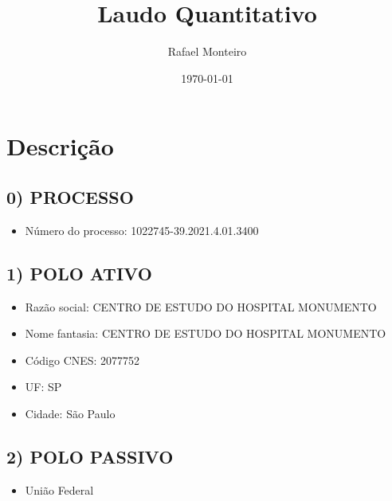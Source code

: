 \documentclass{report}
\title{Laudo Quantitativo}
\author{Rafael Monteiro}
\date{\today}
\begin{document}
\maketitle

\section{Descrição}
\subsection{0) PROCESSO}
\begin{itemize}
	\item{Número do processo: 1022745-39.2021.4.01.3400} 
\end{itemize}


\subsection{1) POLO ATIVO}
\begin{itemize}
	\item{Razão social: CENTRO DE ESTUDO DO HOSPITAL MONUMENTO} 
	\item{Nome fantasia: CENTRO DE ESTUDO DO HOSPITAL MONUMENTO}
	\item{Código CNES: 2077752}
	\item{UF: SP} 
	\item{Cidade: São Paulo} 
\end{itemize}


\subsection{2) POLO PASSIVO}
\begin{itemize}
	\item{União Federal}
\end{itemize}
\end{document}
